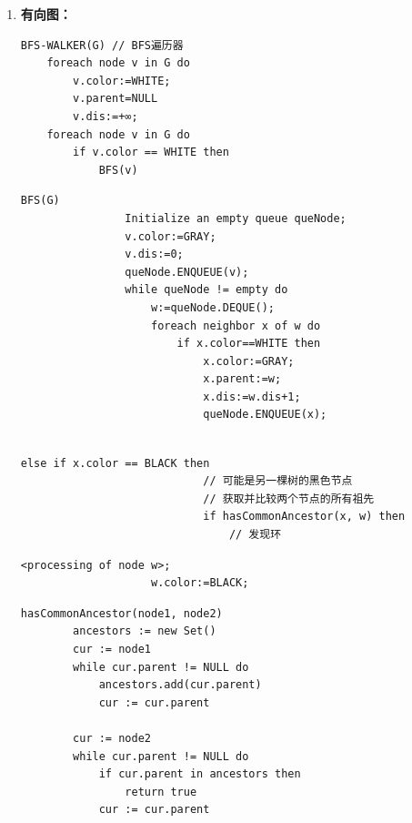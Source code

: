 \documentclass{article}
\begin{document}
\begin{enumerate}
    \item \textbf{有向图：\\}

    \begin{lstlisting}[style=algorithmPPT]
    BFS-WALKER(G) // BFS遍历器
    foreach node v in G do
        v.color:=WHITE; 
        v.parent=NULL 
        v.dis:=+∞;
    foreach node v in G do
        if v.color == WHITE then
            BFS(v)
        \end{lstlisting}

    \begin{lstlisting}[style=algorithmPPT]
            BFS(G)
                Initialize an empty queue queNode;
                v.color:=GRAY;
                v.dis:=0;
                queNode.ENQUEUE(v);
                while queNode != empty do
                    w:=queNode.DEQUE();
                    foreach neighbor x of w do
                        if x.color==WHITE then
                            x.color:=GRAY;
                            x.parent:=w;
                            x.dis:=w.dis+1;
                            queNode.ENQUEUE(x);
                        
                    \end{lstlisting}

    \begin{lstlisting}[style=algorithm]
                        else if x.color == BLACK then 
                            // 可能是另一棵树的黑色节点
                            // 获取并比较两个节点的所有祖先
                            if hasCommonAncestor(x, w) then
                                // 发现环
                        \end{lstlisting}

    \begin{lstlisting}[style=algorithmPPT]
                    <processing of node w>;
                    w.color:=BLACK;
    \end{lstlisting}

    \begin{lstlisting}[style=algorithm]
    hasCommonAncestor(node1, node2)
        ancestors := new Set()
        cur := node1
        while cur.parent != NULL do
            ancestors.add(cur.parent)
            cur := cur.parent
        
        cur := node2
        while cur.parent != NULL do
            if cur.parent in ancestors then
                return true
            cur := cur.parent
        

\end{lstlisting}
\end{enumerate}
\end{document}
